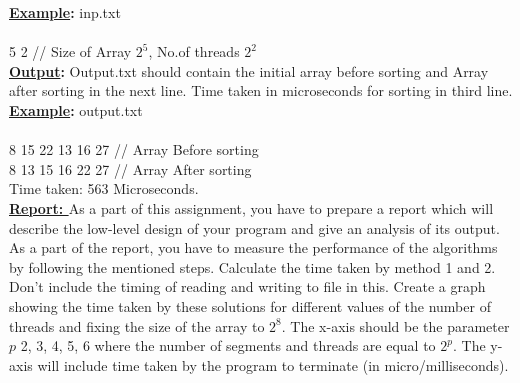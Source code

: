 \documentclass{article}
\begin{document}
\noindent\textbf{\underline {Example}:} inp.txt\\\\
5 2     \hspace{5 mm}          // Size of Array $2^5$, No.of threads $2^2$\\

\noindent\textbf{\underline {Output}:} Output.txt should contain the initial array before sorting and Array after sorting in the next line. Time taken in microseconds for sorting in third line.\\


\noindent\textbf{\underline {Example}:} output.txt\\\\
8 15 22 13 16 27  \hspace{5 mm}          // Array Before sorting \\
8 13 15 16 22 27  \hspace{5 mm}          // Array After sorting \\
Time taken: 563 Microseconds.\\


\noindent\textbf{\underline {Report: }} As a part of this assignment, you have to prepare a report which will describe the low-level design of your program and give an analysis of its output. As a part of the report, you have to measure the performance of the algorithms by following the mentioned steps. Calculate the time taken by method 1 and 2. Don't include the timing of reading and writing to file in this. Create a graph showing the time taken by these solutions for different values of the number of threads and fixing the size of the array to $2^8$. The x-axis should be the parameter $p$ 2, 3, 4, 5, 6 where the number of segments and threads are equal to $2^p$. The y-axis will include time taken by the program to terminate (in micro/milliseconds). 
\end{document}
